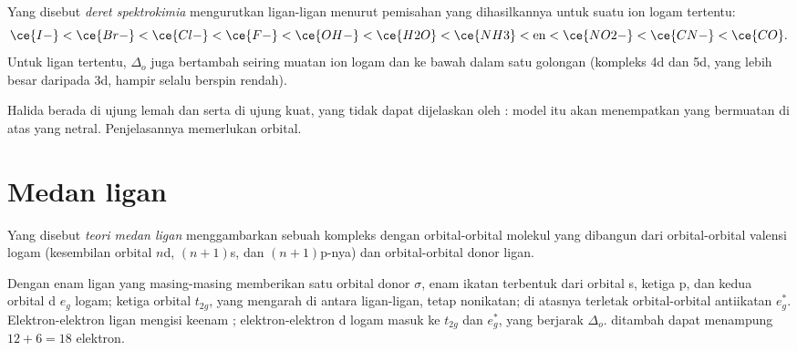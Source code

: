 \begin{definition}\label{def:b2:ligand-field:spectrochemical}
Yang disebut \emph{deret spektrokimia} mengurutkan
ligan-ligan menurut pemisahan yang dihasilkannya untuk suatu ion logam
tertentu:
\[
  \ce{I-} < \ce{Br-} < \ce{Cl-} < \ce{F-} < \ce{OH-} < \ce{H2O} < \ce{NH3} < \text{en} <
  \ce{NO2-} < \ce{CN-} < \ce{CO} .
\]
Untuk ligan tertentu, $\Delta_o$ juga bertambah seiring muatan ion logam dan
ke bawah dalam satu golongan (kompleks 4d dan 5d, yang lebih besar daripada
3d, hampir selalu berspin rendah).
\end{definition}

Halida berada di ujung lemah dan  serta  di ujung kuat, yang
tidak dapat dijelaskan oleh : model itu akan menempatkan
 yang bermuatan di atas  yang netral. Penjelasannya
memerlukan orbital.

\section{Medan ligan}

\begin{definition}\label{def:b2:ligand-field:ligand-field}
Yang disebut \emph{teori medan ligan} menggambarkan
sebuah kompleks dengan orbital-orbital molekul yang dibangun dari
orbital-orbital valensi logam (kesembilan orbital $n$d, $(n+1)$s, dan $(n+1)$p-nya)
dan orbital-orbital donor ligan.
\end{definition}

\begin{proposition}\label{prop:b2:ligand-field:mo-octahedral}
Dengan enam ligan yang masing-masing memberikan satu orbital donor $\sigma$,
enam  ikatan terbentuk dari orbital s, ketiga p, dan kedua
orbital d $e_g$ logam; ketiga orbital $t_{2g}$, yang mengarah di antara
ligan-ligan, tetap nonikatan; di atasnya terletak orbital-orbital antiikatan
$e_g^*$. Elektron-elektron ligan mengisi keenam ; elektron-elektron
d logam masuk ke $t_{2g}$ dan $e_g^*$, yang berjarak $\Delta_o$. 
ditambah  dapat menampung
$12 + 6 = 18$ elektron.
\end{proposition}


